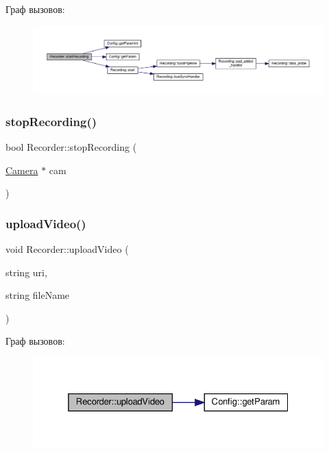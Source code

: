 Граф вызовов\+:\nopagebreak
\begin{figure}[H]
\begin{center}
\leavevmode
\includegraphics[width=350pt]{class_recorder_ac242ca5967dbf81f9ea39464eee2b06a_cgraph}
\end{center}
\end{figure}
\mbox{\label{class_recorder_ae3de658eb341149ef0fb207783b3602b}} 
\subsubsection{\texorpdfstring{stop\+Recording()}{stopRecording()}}
{\footnotesize\ttfamily bool Recorder\+::stop\+Recording (\begin{DoxyParamCaption}\item[{\hyperlink{struct_camera}{Camera} $\ast$}]{cam }\end{DoxyParamCaption})}

\mbox{\label{class_recorder_a2decf81333499f7c9f0193daed7e2091}} 
\subsubsection{\texorpdfstring{upload\+Video()}{uploadVideo()}}
{\footnotesize\ttfamily void Recorder\+::upload\+Video (\begin{DoxyParamCaption}\item[{string}]{uri,  }\item[{string}]{file\+Name }\end{DoxyParamCaption})\hspace{0.3cm}{\ttfamily [private]}}

Граф вызовов\+:\nopagebreak
\begin{figure}[H]
\begin{center}
\leavevmode
\includegraphics[width=325pt]{class_recorder_a2decf81333499f7c9f0193daed7e2091_cgraph}
\end{center}
\end{figure}


